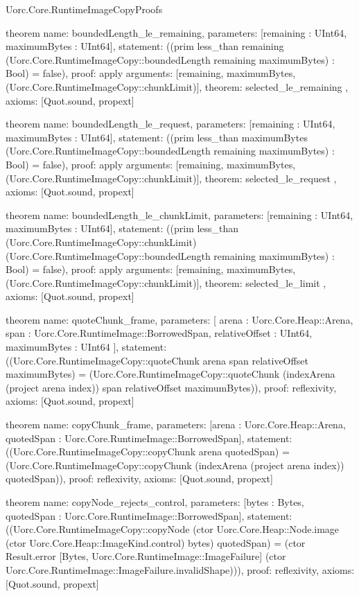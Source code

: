 \begin{lexlean}{Uorc.Core.RuntimeImageCopyProofs}
\begin{semanticmodule}
theorem{
  name: boundedLength_le_remaining,
  parameters: [remaining : UInt64, maximumBytes : UInt64],
  statement: ((prim less_than remaining (Uorc.Core.RuntimeImageCopy::boundedLength remaining maximumBytes) : Bool) = false),
  proof: apply{
    arguments: [remaining, maximumBytes, (Uorc.Core.RuntimeImageCopy::chunkLimit)],
    theorem: selected_le_remaining
  },
  axioms: [Quot.sound, propext]
}

theorem{
  name: boundedLength_le_request,
  parameters: [remaining : UInt64, maximumBytes : UInt64],
  statement: ((prim less_than maximumBytes (Uorc.Core.RuntimeImageCopy::boundedLength remaining maximumBytes) : Bool) = false),
  proof: apply{
    arguments: [remaining, maximumBytes, (Uorc.Core.RuntimeImageCopy::chunkLimit)],
    theorem: selected_le_request
  },
  axioms: [Quot.sound, propext]
}

theorem{
  name: boundedLength_le_chunkLimit,
  parameters: [remaining : UInt64, maximumBytes : UInt64],
  statement: ((prim less_than (Uorc.Core.RuntimeImageCopy::chunkLimit) (Uorc.Core.RuntimeImageCopy::boundedLength remaining maximumBytes) : Bool) = false),
  proof: apply{
    arguments: [remaining, maximumBytes, (Uorc.Core.RuntimeImageCopy::chunkLimit)],
    theorem: selected_le_limit
  },
  axioms: [Quot.sound, propext]
}

theorem{
  name: quoteChunk_frame,
  parameters: [
    arena : Uorc.Core.Heap::Arena,
    span : Uorc.Core.RuntimeImage::BorrowedSpan,
    relativeOffset : UInt64,
    maximumBytes : UInt64
  ],
  statement: ((Uorc.Core.RuntimeImageCopy::quoteChunk arena span relativeOffset maximumBytes) = (Uorc.Core.RuntimeImageCopy::quoteChunk (indexArena (project arena index)) span relativeOffset maximumBytes)),
  proof: reflexivity{},
  axioms: [Quot.sound, propext]
}

theorem{
  name: copyChunk_frame,
  parameters: [arena : Uorc.Core.Heap::Arena, quotedSpan : Uorc.Core.RuntimeImage::BorrowedSpan],
  statement: ((Uorc.Core.RuntimeImageCopy::copyChunk arena quotedSpan) = (Uorc.Core.RuntimeImageCopy::copyChunk (indexArena (project arena index)) quotedSpan)),
  proof: reflexivity{},
  axioms: [Quot.sound, propext]
}

theorem{
  name: copyNode_rejects_control,
  parameters: [bytes : Bytes, quotedSpan : Uorc.Core.RuntimeImage::BorrowedSpan],
  statement: ((Uorc.Core.RuntimeImageCopy::copyNode (ctor Uorc.Core.Heap::Node.image (ctor Uorc.Core.Heap::ImageKind.control) bytes) quotedSpan) = (ctor Result.error [Bytes, Uorc.Core.RuntimeImage::ImageFailure] (ctor Uorc.Core.RuntimeImage::ImageFailure.invalidShape))),
  proof: reflexivity{},
  axioms: [Quot.sound, propext]
}


\end{semanticmodule}
\end{lexlean}
